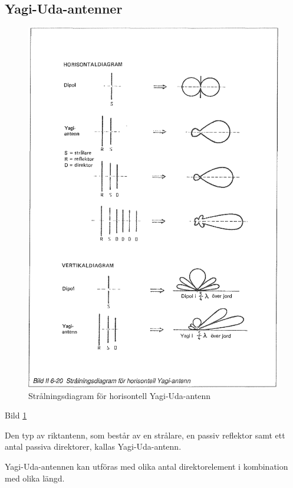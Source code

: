 \subsection{Yagi-Uda-antenner}

\begin{figure}
  \includegraphics[width=\textwidth]{images/bild_2_6-20}
  \caption{Strålningsdiagram för horisontell Yagi-Uda-antenn}
  \label{fig:bildII6-20}
\end{figure}

Bild \ref{fig:bildII6-20}

Den typ av riktantenn, som består av en strålare, en passiv reflektor
samt ett antal passiva direktorer, kallas Yagi-Uda-antenn.

Yagi-Uda-antennen kan utföras med olika antal direktorelement i
kombination med olika längd.


